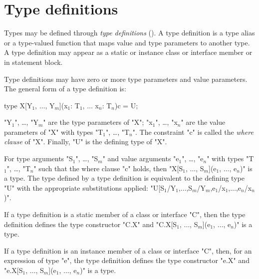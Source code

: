\section{Type definitions}
\label{TypeDefs}


        Types may be defined through {\em type definitions}
        ().
        A type definition is a type alias or a type-valued function
        that maps value and type parameters to another type.
        A type definition may appear as a static or instance
        class or interface
        member or in statement block.

        Type definitions may have zero or more type parameters
        and value parameters.
The general form of a type definition is:

\begin{xtenmath}
type X[Y$_1$, $\dots$, Y$_m$](x$_1$: T$_1$, $\dots$ x$_n$: T$_n$){c} = U;
\end{xtenmath}

\xcdmath"Y$_1$", \dots, \xcdmath"Y$_m$"
are the type parameters of \xcd"X";
\xcdmath"x$_1$", \dots, \xcdmath"x$_n$"
are the value parameters of \xcd"X" with types
\xcdmath"T$_1$", \dots, \xcdmath"T$_n$".
The constraint \xcd"c" is called the \emph{where clause} of
\xcd"X".  Finally, \xcd"U" is the defining type of \xcd"X".
\label{TypeDefWhereClause}

        For
        type arguments 
\xcdmath"S$_1$", \dots, \xcdmath"S$_m$"
and value arguments
\xcdmath"e$_1$", \dots, \xcdmath"e$_n$"
with types
\xcdmath"T$_1$", \dots, \xcdmath"T$_n$"
such that the where clause \xcd"c" holds, then
\xcdmath"X[S$_1$, $\dots$, S$_m$](e$_1$, $\dots$, e$_n$)"
is a type.
The type defined by a type definition is equivalent to 
the defining type \xcd"U" with the appropriate substitutions applied:
\xcdmath"U[S$_1$/Y$_1$,$\dots$,S$_m$/Y$_m$,e$_1$/x$_1$,$\dots$,e$_n$/x$_n$)".

        If a type definition 
        is a static member of a class or
        interface \xcd"C", then the type definition
        defines the type constructor \xcd"C.X"
and
\xcdmath"C.X[S$_1$, $\dots$, S$_m$](e$_1$, $\dots$, e$_n$)"
is a type.

        If a type definition 
        is an instance member of a class or
        interface \xcd"C", then, for an expression of type
        \xcd"e", the type definition
        defines the type constructor \xcd"e.X"
and
\xcdmath"e.X[S$_1$, $\dots$, S$_m$](e$_1$, $\dots$, e$_n$)"
is a type.

